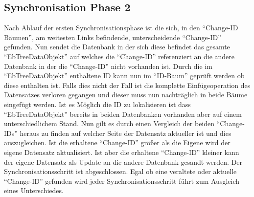 \documentclass[a4paper,11pt,oneside,%
headsepline,												%
footsepline,												%
bibtotocnumbered									%
]{scrreprt}
\begin{document}

\subsection{Synchronisation Phase 2}
Nach Ablauf der ersten Synchronisationsphase ist die sich, in den \enquote{Change-ID Bäumen}, am weitesten Links befindende, unterscheidende \enquote{Change-ID} gefunden. Nun sendet die Datenbank in der sich diese befindet das gesamte \enquote{EbTreeDataObjekt} auf welches die \enquote{Change-ID} referenziert an die andere Datenbank in der die \enquote{Change-ID} nicht vorhanden ist. Durch die im \enquote{EbTreeDataObjekt} enthaltene \ac{ID} kann nun im  \enquote{ID-Baum} geprüft werden ob diese enthalten ist. Falls dies nicht der Fall ist die komplette Einfügeoperation des Datensatzes verloren gegangen und dieser muss nun nachträglich in beide Bäume eingefügt werden. Ist es Möglich die \ac{ID} zu lokalisieren ist dass \enquote{EbTreeDataObjekt} bereits in beiden Datenbanken vorhanden aber auf einem unterschiedlichem Stand. Nun gilt es durch einen Vergleich der beiden \enquote{Change-IDs} heraus zu finden auf welcher Seite der Datensatz aktueller ist und dies auszugleichen. Ist die erhaltene \enquote{Change-ID} größer als die Eigene wird der eigene Datensatz aktualisiert. Ist aber die erhaltene \enquote{Change-ID} kleiner kann der eigene Datensatz als Update an die andere Datenbank gesandt werden. Der Synchronisationsschritt ist abgeschlossen. Egal ob eine veraltete oder aktuelle  \enquote{Change-ID} gefunden wird jeder Synchronisationsschritt führt zum Ausgleich eines Unterschiedes.
	
\end{document}
